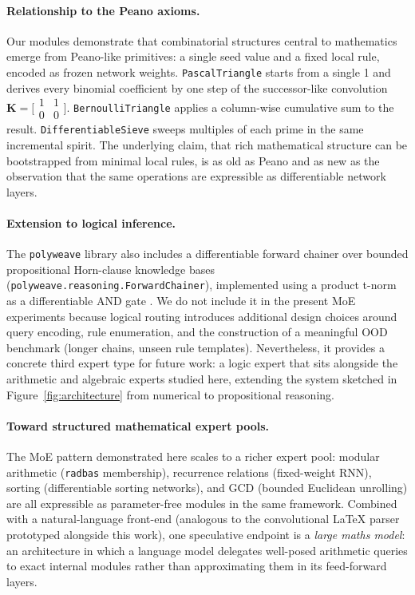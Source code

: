 \documentclass{article}
\begin{document}
\paragraph{Relationship to the Peano axioms.}
Our modules demonstrate that combinatorial structures central to mathematics emerge from
Peano-like primitives: a single seed value and a fixed local rule, encoded as frozen
network weights. \texttt{PascalTriangle} starts from a single 1 and derives every
binomial coefficient by one step of the successor-like convolution
$\mathbf{K} = \bigl[\begin{smallmatrix}1&1\\0&0\end{smallmatrix}\bigr]$.
\texttt{BernoulliTriangle} applies a column-wise cumulative sum to the result.
\texttt{DifferentiableSieve} sweeps multiples of each prime in the same incremental
spirit. The underlying claim, that rich mathematical structure can be bootstrapped from
minimal local rules, is as old as Peano and as new as the observation that the same
operations are expressible as differentiable network layers.

\paragraph{Extension to logical inference.}
The \texttt{polyweave} library also includes a differentiable forward chainer over
bounded propositional Horn-clause knowledge bases
(\texttt{polyweave.reasoning.ForwardChainer}), implemented using a product t-norm as a
differentiable AND gate \citep{paper1}.
We do not include it in the present MoE experiments because logical routing introduces
additional design choices around query encoding, rule enumeration, and the construction
of a meaningful OOD benchmark (longer chains, unseen rule templates).
Nevertheless, it provides a concrete third expert type for future work: a logic expert
that sits alongside the arithmetic and algebraic experts studied here, extending the
system sketched in Figure~\ref{fig:architecture} from numerical to propositional
reasoning.

\paragraph{Toward structured mathematical expert pools.}
The MoE pattern demonstrated here scales to a richer expert pool: modular arithmetic
(\texttt{radbas} membership), recurrence relations (fixed-weight RNN), sorting
(differentiable sorting networks), and GCD (bounded Euclidean unrolling) are all
expressible as parameter-free modules in the same framework. Combined with a
natural-language front-end (analogous to the convolutional LaTeX parser prototyped
alongside this work), one speculative endpoint is a \emph{large maths model}: an
architecture in which a language model delegates well-posed arithmetic queries to
exact internal modules rather than approximating them in its feed-forward layers.
\end{document}
